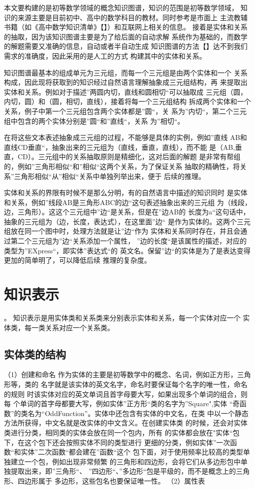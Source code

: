 \documentclass{standalone}
\begin{document}
本文要构建的是初等数学领域的概念知识图谱，知识的范围是初等数学领域，
知识的来源主要是目前初中、高中的数学科目的教材。同时参考是市面上
主流教辅书籍（如《高中数学知识清单》【】）和互联网上相关的信息。
接着是实体和关系的抽取，因为该知识图谱主要是为了给后面的自动求解
系统作为基础的，而数学的解题需要又准确的信息，自动或者半自动生成
知识图谱的方法【】达不到我们需求的准确度，因此采用的是人工的方式
构建其中的实体和关系。

知识图谱最基本的组成单元为三元组，而每一个三元组是由两个实体和一个
关系构成，因此现将获取到的知识经过自然语言理解抽象成三元组结构，再
来提取出实体和关系。例如对于描述”两圆内切，直线和圆相切“可以抽取成
三元组（圆，内切，圆）和（圆，相切，直线），接着将每一个三元组结构
拆成两个实体和一个关系，例子中第一个三元组包含两个实体都是”圆“，关
系为”内切“，第二个三元组中包含的两个实体分别是”圆“和”直线“，关系
为”相切“。

在将这些文本表述抽象成三元组的过程，不能够是具体的实例，例如”直线
AB和直线CD垂直“，抽象出来的三元组为（直线，垂直，直线），而不能
是（AB,垂直，CD）。三元组中的关系抽取原则是精细化，这对后面的解题
是非常有帮组的，例如”三角形相似“和”相似“这两个关系，为了保证关系
抽取的精确性，将关系”三角形相似“从”相似“关系中单独列举出来，便于
后续的推理。

实体和关系的界限有时候不是那么分明，有的自然语言中描述的知识同时
是实体和关系，例如”线段AB是三角形ABC的边“这句表述抽象出来的三元组
为（线段，边，三角形）。这这个三元组中”边“是关系，但是在”边AB的
长度为a“这句话中，抽象的三元组为（边，长度，表达式），在这里面”边“
是作为实体的。这两个三元组放在同一个图中时，处理方法就是让”边“作为
实体和关系同时存在，并且会通过第二个三元组为”边“关系添加一个属性，
”边的长度“是该属性的描述，对应的类型为”EXpress“，即实体”表达式“的
英文名。保留”边“的实体是为了是表达变得更加的简单明了，可以降低后续
推理的复杂度。
\section{知识表示}。
知识表示是用实体类和关系类来分别表示实体和关系，每一个实体对应一个
实体类，每一类关系对应一个关系类。
\subsection{实体类的结构}
（1）创建和命名
作为实体的主要是初等数学中的概念、名词，例如正方形，三角形等，类的
名字就是该实体的英文名字，命名时要保证每个名字的唯一性，命名的规则
时该实体对应的英文单词且首字母要大写，如果出现多个单词的组合，则每
个单词的首字母都要大写，例如实体”正方形“类的名字为”Square",实体
“奇函数”的类名为“OddFunction”。实体中还包含有实体的中文名，在类
中以一个静态方法所获得，中文名就是改实体的中文含义。在创建实体类
的时候，还会对实体类进行分类，相同类的实体会放在同一个包内，所有
的实体都会放在"实体“包下，在这个包下还会按照实体不同的类型进行
更细的分类，例如实体”一次函数“和实体”二次函数“都会建在”函数“这个
包下面，对于使用频率比较高的类型单独建立一个包，例如出现非常频繁
的三角形和四边形，会将它们从多边形包中单独提取出来，即”三角形“、
”四边形“、”多边形“包是平级的，而不是概念上的三角形、四边形属于
多边形，这些包名也要保证唯一性。
（2）属性表
\end{document}
